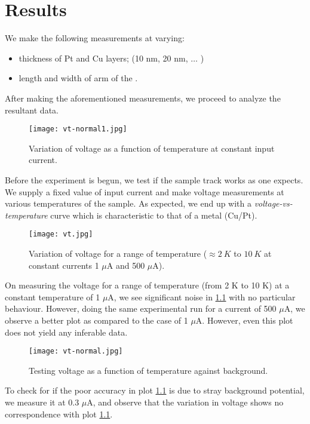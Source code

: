 \chapter{Results}

We make the following measurements at varying:

\begin{itemize}
    \item thickness of Pt and Cu layers; (10 nm, 20 nm, $\ldots$ )
    \item length and width of arm of the \Hst.
\end{itemize}

\label{chapter5}

After making the aforementioned measurements, we proceed to analyze the resultant data.

\begin{figure}[h]
    \centering
    \texttt{[image: vt-normal1.jpg]}
    \caption{Variation of voltage as a function of temperature at constant input current.}
\end{figure}

Before the experiment is begun, we test if the sample track works as one expects.
We supply a fixed value of input current and make voltage measurements at various temperatures of the sample.
As expected, we end up with a \textit{voltage-vs-temperature} curve which is characteristic to that of a metal (Cu/Pt).

\begin{figure}[h]
    \centering
    \texttt{[image: vt.jpg]}
    \caption{Variation of voltage for a range of temperature (\( \approx 2 \: K \) to \( 10 \: K \) at constant currents 1 \( \mu \)A and 500 \( \mu \)A).}
    \label{fig:vt}
\end{figure}

On measuring the voltage for a range of temperature (from 2 K to 10 K) at a constant temperature of 1 \( \mu \)A, we see significant noise in \cref{fig:vt} with no particular behaviour. However, doing the same experimental run for a current of 500 \( \mu \)A, we observe a better plot as compared to the case of 1 \( \mu \)A. However, even this plot does not yield any inferable data.

\begin{figure}[h]
    \centering
    \texttt{[image: vt-normal.jpg]}
    \caption{Testing voltage as a function of temperature against background.}
\end{figure}

To check for if the poor accuracy in plot \ref{fig:vt} is due to stray background potential, we measure it at 0.3 \( \mu \)A, and observe that the variation in voltage shows no correspondence with plot \ref{fig:vt}.

